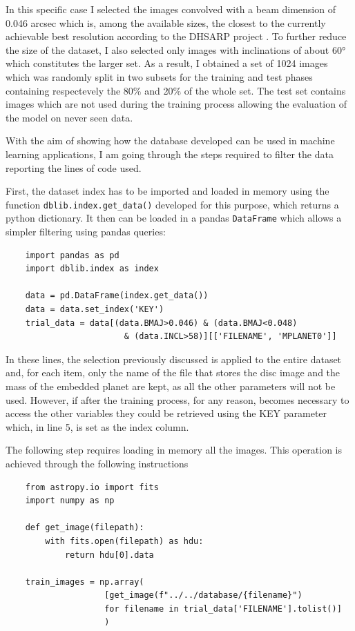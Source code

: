\documentclass[a4paper,10pt]{report}
\begin{document}
In this specific case I selected the images convolved with a beam dimension of 0.046 arcsec which is,
among the available sizes, the closest to the currently achievable best resolution according to the DHSARP project \citep{dsharp}.
To further reduce the size of the dataset, I also selected only images with inclinations of about
60° which constitutes the larger set.
As a result, I obtained a set of 1024 images which was randomly split in two subsets for the training and
test phases containing respectevely the 80\% and 20\% of the whole set.
The test set contains images which are not used during the training process allowing the evaluation
of the model on never seen data.

With the aim of showing how the database developed can be used in machine learning applications,
I am going through the steps required to filter the data reporting the lines of code used.

First, the dataset index has to be imported and loaded in memory using 
the function \lstinline{dblib.index.get_data()} 
developed for this purpose, which returns
a python dictionary. It then can be loaded in a pandas \lstinline{DataFrame}
which allows a simpler filtering using pandas queries:

\begin{lstlisting}
    import pandas as pd
    import dblib.index as index

    data = pd.DataFrame(index.get_data())
    data = data.set_index('KEY')
    trial_data = data[(data.BMAJ>0.046) & (data.BMAJ<0.048)
                        & (data.INCL>58)][['FILENAME', 'MPLANET0']]
\end{lstlisting}

In these lines, the selection previously discussed is applied to the entire dataset and,
for each item, only the name of the file that stores the disc image and the mass of the embedded planet are kept, as
all the other parameters will not be used. However, if after the training process, for any reason, becomes necessary
to access the other variables they could be retrieved using the KEY parameter which, in line 5, is set as 
the index column.

The following step requires loading in memory all the images. This operation is achieved through the following
instructions

\begin{lstlisting}
    from astropy.io import fits
    import numpy as np

    def get_image(filepath):
        with fits.open(filepath) as hdu:
            return hdu[0].data
    
    train_images = np.array(
                    [get_image(f"../../database/{filename}") 
                    for filename in trial_data['FILENAME'].tolist()]
                    )
\end{lstlisting}
\end{document}
